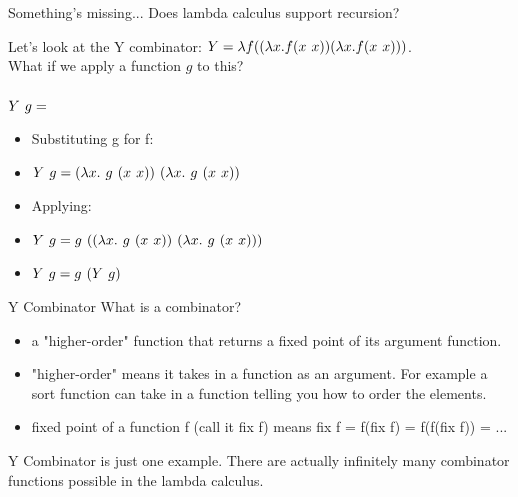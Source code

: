 \documentclass[aspectratio=169]{beamer}
\begin{document}
\begin{frame}{Something's missing...}
Does lambda calculus support recursion? \pause

Let's look at the Y combinator: $Y = \lambda f ((\lambda x. f (x \hspace{0.05in} x)) (\lambda x. f (x \hspace{0.05in} x)))$. \\ What if we apply a function $g$ to this? \\ \\
$Y\hspace{0.05in} g = $
\begin{itemize}
\item Substituting g for f:
\item $Y\hspace{0.05in} g = (\lambda x.\hspace{0.05in} g\hspace{0.05in} (x\hspace{0.05in} x))\hspace{0.05in} (\lambda x.\hspace{0.05in} g\hspace{0.05in} (x\hspace{0.05in} x))$ \pause
\item Applying:
\item $Y\hspace{0.05in} g = g\hspace{0.05in} ((\lambda x.\hspace{0.05in} g\hspace{0.05in} (x\hspace{0.05in} x))\hspace{0.05in} (\lambda x.\hspace{0.05in} g\hspace{0.05in} (x\hspace{0.05in} x)))$
\item $Y\hspace{0.05in} g = g\hspace{0.05in} (Y\hspace{0.05in} g)$
\end{itemize}
\end{frame}

\begin{frame}{Y Combinator}
What is a combinator?
\begin{itemize}
\item a "higher-order" function that returns a fixed point of its argument function.
\item "higher-order" means it takes in a function as an argument. For example a sort function can take in a function telling you how to order the elements.
\item fixed point of a function f (call it fix f) means fix f = f(fix f) = f(f(fix f)) = ...
\end{itemize}
\pause
Y Combinator is just one example. There are actually infinitely many combinator functions possible in the lambda calculus.
\end{frame}
\end{document}
